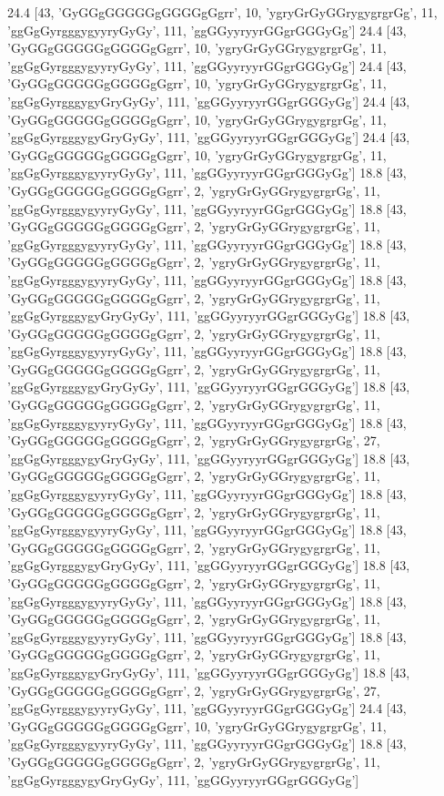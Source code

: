 24.4 [43, 'GyGGgGGGGGgGGGGgGgrr', 10, 'ygryGrGyGGrygygrgrGg', 11, 'ggGgGyrgggygyyryGyGy', 111, 'ggGGyyryyrGGgrGGGyGg']
24.4 [43, 'GyGGgGGGGGgGGGGgGgrr', 10, 'ygryGrGyGGrygygrgrGg', 11, 'ggGgGyrgggygyyryGyGy', 111, 'ggGGyyryyrGGgrGGGyGg']
24.4 [43, 'GyGGgGGGGGgGGGGgGgrr', 10, 'ygryGrGyGGrygygrgrGg', 11, 'ggGgGyrgggygyGryGyGy', 111, 'ggGGyyryyrGGgrGGGyGg']
24.4 [43, 'GyGGgGGGGGgGGGGgGgrr', 10, 'ygryGrGyGGrygygrgrGg', 11, 'ggGgGyrgggygyGryGyGy', 111, 'ggGGyyryyrGGgrGGGyGg']
24.4 [43, 'GyGGgGGGGGgGGGGgGgrr', 10, 'ygryGrGyGGrygygrgrGg', 11, 'ggGgGyrgggygyyryGyGy', 111, 'ggGGyyryyrGGgrGGGyGg']
18.8 [43, 'GyGGgGGGGGgGGGGgGgrr', 2, 'ygryGrGyGGrygygrgrGg', 11, 'ggGgGyrgggygyyryGyGy', 111, 'ggGGyyryyrGGgrGGGyGg']
18.8 [43, 'GyGGgGGGGGgGGGGgGgrr', 2, 'ygryGrGyGGrygygrgrGg', 11, 'ggGgGyrgggygyyryGyGy', 111, 'ggGGyyryyrGGgrGGGyGg']
18.8 [43, 'GyGGgGGGGGgGGGGgGgrr', 2, 'ygryGrGyGGrygygrgrGg', 11, 'ggGgGyrgggygyyryGyGy', 111, 'ggGGyyryyrGGgrGGGyGg']
18.8 [43, 'GyGGgGGGGGgGGGGgGgrr', 2, 'ygryGrGyGGrygygrgrGg', 11, 'ggGgGyrgggygyGryGyGy', 111, 'ggGGyyryyrGGgrGGGyGg']
18.8 [43, 'GyGGgGGGGGgGGGGgGgrr', 2, 'ygryGrGyGGrygygrgrGg', 11, 'ggGgGyrgggygyyryGyGy', 111, 'ggGGyyryyrGGgrGGGyGg']
18.8 [43, 'GyGGgGGGGGgGGGGgGgrr', 2, 'ygryGrGyGGrygygrgrGg', 11, 'ggGgGyrgggygyGryGyGy', 111, 'ggGGyyryyrGGgrGGGyGg']
18.8 [43, 'GyGGgGGGGGgGGGGgGgrr', 2, 'ygryGrGyGGrygygrgrGg', 11, 'ggGgGyrgggygyyryGyGy', 111, 'ggGGyyryyrGGgrGGGyGg']
18.8 [43, 'GyGGgGGGGGgGGGGgGgrr', 2, 'ygryGrGyGGrygygrgrGg', 27, 'ggGgGyrgggygyGryGyGy', 111, 'ggGGyyryyrGGgrGGGyGg']
18.8 [43, 'GyGGgGGGGGgGGGGgGgrr', 2, 'ygryGrGyGGrygygrgrGg', 11, 'ggGgGyrgggygyyryGyGy', 111, 'ggGGyyryyrGGgrGGGyGg']
18.8 [43, 'GyGGgGGGGGgGGGGgGgrr', 2, 'ygryGrGyGGrygygrgrGg', 11, 'ggGgGyrgggygyyryGyGy', 111, 'ggGGyyryyrGGgrGGGyGg']
18.8 [43, 'GyGGgGGGGGgGGGGgGgrr', 2, 'ygryGrGyGGrygygrgrGg', 11, 'ggGgGyrgggygyGryGyGy', 111, 'ggGGyyryyrGGgrGGGyGg']
18.8 [43, 'GyGGgGGGGGgGGGGgGgrr', 2, 'ygryGrGyGGrygygrgrGg', 11, 'ggGgGyrgggygyyryGyGy', 111, 'ggGGyyryyrGGgrGGGyGg']
18.8 [43, 'GyGGgGGGGGgGGGGgGgrr', 2, 'ygryGrGyGGrygygrgrGg', 11, 'ggGgGyrgggygyyryGyGy', 111, 'ggGGyyryyrGGgrGGGyGg']
18.8 [43, 'GyGGgGGGGGgGGGGgGgrr', 2, 'ygryGrGyGGrygygrgrGg', 11, 'ggGgGyrgggygyGryGyGy', 111, 'ggGGyyryyrGGgrGGGyGg']
18.8 [43, 'GyGGgGGGGGgGGGGgGgrr', 2, 'ygryGrGyGGrygygrgrGg', 27, 'ggGgGyrgggygyyryGyGy', 111, 'ggGGyyryyrGGgrGGGyGg']
24.4 [43, 'GyGGgGGGGGgGGGGgGgrr', 10, 'ygryGrGyGGrygygrgrGg', 11, 'ggGgGyrgggygyyryGyGy', 111, 'ggGGyyryyrGGgrGGGyGg']
18.8 [43, 'GyGGgGGGGGgGGGGgGgrr', 2, 'ygryGrGyGGrygygrgrGg', 11, 'ggGgGyrgggygyGryGyGy', 111, 'ggGGyyryyrGGgrGGGyGg']
